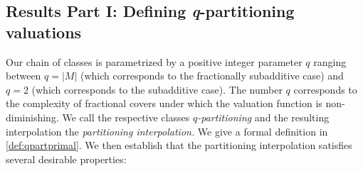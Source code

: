 \documentclass[11pt]{article}%
\numberwithin{theorem}{subsection}
\def\hmath$#1${\texorpdfstring{{\rmfamily\textit{#1}}}{#1}}
\begin{document}
\subsection{Results Part I: Defining \hmath$q$-partitioning valuations}

Our chain of classes is parametrized by a positive integer parameter $q$ ranging between $q= |M|$ (which corresponds to the fractionally subadditive case) and $q = 2$ (which corresponds to the subadditive case). The number $q$ corresponds to the complexity of fractional covers under which the valuation function is non-diminishing. We call the respective classes \textit{$q$-partitioning} and the resulting interpolation the \textit{partitioning interpolation.} We give a formal definition in \cref{def:qpartprimal}. We then establish that the partitioning interpolation satisfies several desirable properties:
\end{document}
